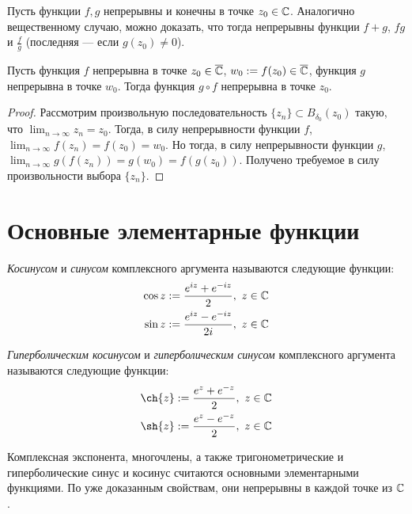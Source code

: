 \begin{note}
	Пусть функции $f, g$ непрерывны и конечны в точке $z_0 \in \mathbb{C}$. Аналогично вещественному случаю, можно доказать, что тогда непрерывны функции $f + g$, $fg$ и $\frac fg$ (последняя --- если $g(z_0) \ne 0$).
\end{note}

\begin{proposition}
	Пусть функция $f$ непрерывна в точке $z_0 \in \overline{\mathbb{C}}$, $w_0 := f(z_0) \in \overline{\mathbb{C}}$, функция $g$ непрерывна в точке $w_0$. Тогда функция $g \circ f$ непрерывна в точке $z_0$.
\end{proposition}

\begin{proof}
	Рассмотрим произвольную последовательность $\{z_n\} \subset B_{\delta_0}(z_0)$ такую, что $\lim_{n \to \infty}z_n = z_0$. Тогда, в силу непрерывности функции $f$, $\lim_{n \to \infty}f(z_n) = f(z_0) = w_0$. Но тогда, в силу непрерывности функции $g$, $\lim_{n \to \infty}g(f(z_n)) = g(w_0) = f(g(z_0))$. Получено требуемое в силу произвольности выбора $\{z_n\}$.
\end{proof}

\section{Основные элементарные функции}

\begin{definition}
	\textit{Косинусом} и \textit{синусом} комплексного аргумента называются следующие функции:
	\begin{align*}
		\cos{z} := \frac{e^{iz} + e^{-iz}}2,~z \in \mathbb{C}
		\\
		\sin{z} := \frac{e^{iz} - e^{-iz}}{2i},~z \in \mathbb{C}
	\end{align*}
\end{definition}

\begin{definition}
	\textit{Гиперболическим косинусом} и \textit{гиперболическим синусом} комплексного аргумента называются следующие функции:
	\begin{align*}
		\ch{z} := \frac{e^{z} + e^{-z}}2,~z \in \Cm
		\\
		\sh{z} := \frac{e^{z} - e^{-z}}{2},~z \in \Cm
	\end{align*}
\end{definition}

\begin{note}
	Комплексная экспонента, многочлены, а также тригонометрические и гиперболические синус и косинус считаются основными элементарными функциями. По уже доказанным свойствам, они непрерывны в каждой точке из $\mathbb{C}$.
\end{note}